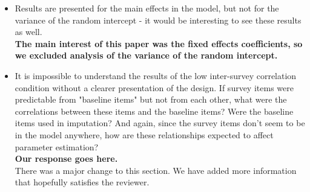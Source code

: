 \documentclass[letterpaper,12pt]{article}\usepackage[]{graphicx}\usepackage[]{color}
\begin{document}
\begin{itemize}
{\bf Our response goes here.}\\
The correlation matrix used needs to be added to the paper.  

\item Results are presented for the main effects in the model, but not for the variance of the random intercept - it would be interesting to see these results as well.\\

{\bf The main interest of this paper was the fixed effects coefficients, so we excluded analysis of the variance of the random intercept.  }\\
% 
% 

\item It is impossible to understand the results of the low inter-survey correlation condition without a clearer presentation of the design. If survey items were predictable from "baseline items" but not from each other, what were the correlations between these items and the baseline items? Were the baseline items used in imputation? And again, since the survey items don't seem to be in the model anywhere, how are these relationships expected to affect parameter estimation?\\

{\bf Our response goes here.}\\
There was a major change to this section.  We have added more information that hopefully satisfies the reviewer.  

\end{itemize}



%
%
\end{document}
